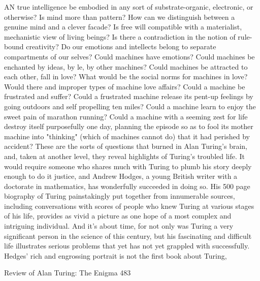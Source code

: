 AN true intelligence be embodied in any sort of substrate-organic, electronic, or
otherwise? Is mind more than pattern? How can we distinguish between a genuine
mind and a clever facade? Is free will compatible with a materialist, mechanistic view
of living beings? Is there a contradiction in the notion of rule-bound creativity? Do
our emotions and intellects belong to separate compartments of our selves? Could
machines have emotions? Could machines be enchanted by ideas, by le, by other
machines? Could machines be attracted to each other, fall in love? What would be the
social norms for machines in love? Would there and improper types of machine love
affairs? Could a machine be frustrated and suffer? Could a frustrated machine release
its pent-up feelings by going outdoors and self propelling ten miles? Could a machine
learn to enjoy the sweet pain of marathon running? Could a machine with a seeming
zest for life destroy itself purposefully one day, planning the episode so as to fool its
mother machine into "thinking" (which of machines cannot do) that it had perished by
accident?
        These are the sorts of questions that burned in Alan Turing's brain, and, taken
at another level, they reveal highlights of Turing's troubled life. It would require
someone who shares much with Turing to plumb his story deeply enough to do it
justice, and Andrew Hodges, a young British writer with a doctorate in mathematics,
has wonderfully succeeded in doing so. His 500 page biography of Turing
painstakingly put together from innumerable sources, including conversations with
scores of people who knew Turing at various stages of his life, provides as vivid a
picture as one hope of a most complex and intriguing individual. And it's about time,
for not only was Turing a very significant person in the science of this century, but his
fascinating and difficult life illustrates serious problems that yet has not yet grappled
with successfully.
        Hedges' rich and engrossing portrait is not the first book about Turing,




Review of Alan Turing: The Enigma                                                    483

